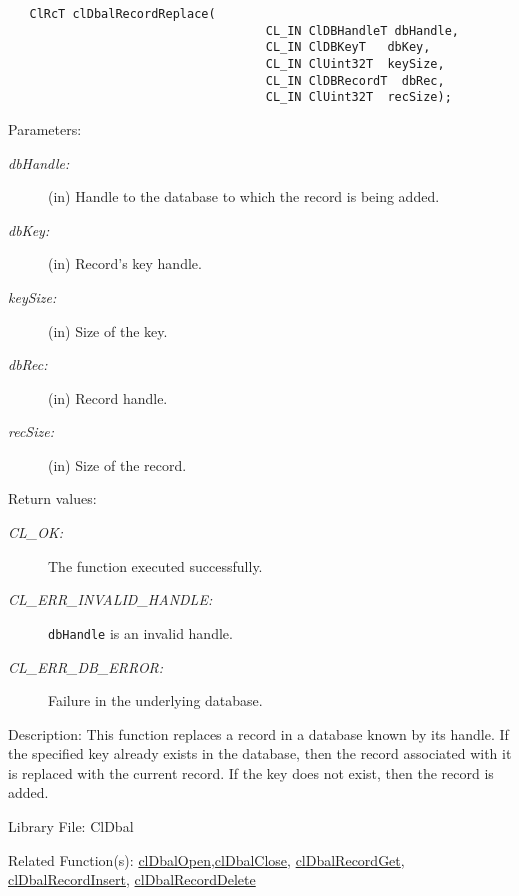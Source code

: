 \begin{flushleft}
\begin{Desc}
\footnotesize\begin{verbatim}   ClRcT clDbalRecordReplace(
                                	CL_IN ClDBHandleT dbHandle,
                                	CL_IN ClDBKeyT   dbKey,
                                	CL_IN ClUint32T  keySize,
                                	CL_IN ClDBRecordT  dbRec,
                                	CL_IN ClUint32T  recSize);
\end{verbatim}
\normalsize
\end{Desc}
\begin{Desc}
\item[Parameters:]
\begin{description}
\item[{\em db\-Handle:}](in) Handle to the database to which the record is being added. \item[{\em db\-Key:}](in) Record's key handle.
\item[{\em key\-Size:}](in) Size of the key. \item[{\em db\-Rec:}](in) Record handle. \item[{\em rec\-Size:}](in) Size of the record.\end{description}
\end{Desc}
\begin{Desc}
\item[Return values:]
\begin{description}
\item[{\em CL\_\-OK:}]The function executed successfully. 
\item[{\em CL\_\-ERR\_\-INVALID\_\-HANDLE:}]{\tt{dbHandle}} is an invalid handle. 
\item[{\em CL\_\-ERR\_\-DB\_\-ERROR:}]Failure in the underlying database.
\end{description}
\end{Desc}
\begin{Desc}
\item[Description:]This function replaces a record in a database known by its handle. If the specified key already exists in the database, then the 
record associated with it is replaced with the current record. If the key does not exist, then the record is added.\end{Desc}
\begin{Desc}
\item[Library File:]Cl\-Dbal\end{Desc}
\begin{Desc}
\item[Related Function(s):]\hyperlink{pagedbal103}{cl\-Dbal\-Open},\hyperlink{pagedbal104}{cl\-Dbal\-Close},
\hyperlink{pagedbal107}{cl\-Dbal\-Record\-Get}, \hyperlink{pagedbal105}{cl\-Dbal\-Record\-Insert}, 
\hyperlink{pagedbal108}{cl\-Dbal\-Record\-Delete} \end{Desc}



\end{flushleft}

